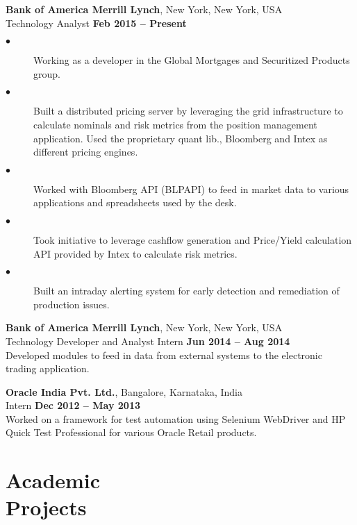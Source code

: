 \documentclass[margin,line]{res}
\begin{document}
\begin{resume}
    \textbf{Bank of America Merrill Lynch}, New York, New York, USA \vspace{2mm}\\\vspace{1mm}%
    \textnormal{Technology Analyst} \hfill \textbf{Feb 2015 -- Present}
    \begin{description}
     \item[$\bullet$] Working as a developer in the Global Mortgages and Securitized Products group.
     \item[$\bullet$] Built a distributed pricing server by leveraging the grid infrastructure to calculate nominals and risk metrics from the position management application. Used the proprietary quant lib., Bloomberg and Intex as different pricing engines.
     \item[$\bullet$] Worked with Bloomberg API (BLPAPI) to feed in market data to various applications and spreadsheets used by the desk.
     \item[$\bullet$] Took initiative to leverage cashflow generation and Price/Yield calculation API provided by Intex to calculate risk metrics.
     \item[$\bullet$] Built an intraday alerting system for early detection and remediation of production issues.
	\end{description}

    \textbf{Bank of America Merrill Lynch}, New York, New York, USA \vspace{2mm}\\\vspace{1mm}%
    \textnormal{Technology Developer and Analyst Intern} \hfill \textbf{Jun 2014 -- Aug 2014}\\
    Developed modules to feed in data from external systems to the electronic trading application. 
    
    \textbf{Oracle India Pvt. Ltd.}, Bangalore, Karnataka, India \vspace{2mm}\\\vspace{1mm}%
    \textnormal{Intern} \hfill \textbf{Dec 2012 -- May 2013}\\
    Worked on a framework for test automation using Selenium WebDriver and HP Quick Test Professional for various Oracle Retail products.
    
    \section{\mysidestyle Academic\\Projects}


\end{resume}
\end{document}
